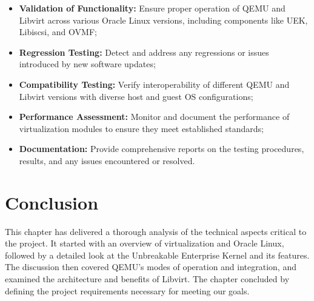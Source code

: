 \begin{itemize}
    \item \textbf{Validation of Functionality:} Ensure proper operation of QEMU and Libvirt across various Oracle Linux versions, including components like UEK, Libiscsi, and OVMF;
    \item \textbf{Regression Testing:} Detect and address any regressions or issues introduced by new software updates;
    \item \textbf{Compatibility Testing:} Verify interoperability of different QEMU and Libvirt versions with diverse host and guest OS configurations;
    \item \textbf{Performance Assessment:} Monitor and document the performance of virtualization modules to ensure they meet established standards;
    \item \textbf{Documentation:} Provide comprehensive reports on the testing procedures, results, and any issues encountered or resolved.
\end{itemize}
\section{Conclusion}
This chapter has delivered a thorough analysis of the technical aspects critical to the project. It started with an overview of virtualization and Oracle Linux, followed by a detailed look at the Unbreakable Enterprise Kernel and its features. The discussion then covered QEMU’s modes of operation and integration, and examined the architecture and benefits of Libvirt. The chapter concluded by defining the project requirements necessary for meeting our goals.
